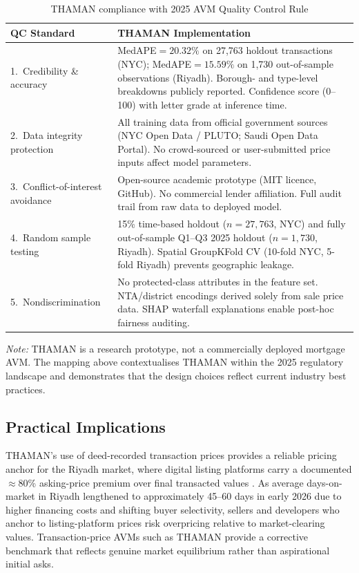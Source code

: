 \documentclass[11pt, a4paper, twoside]{article}
\begin{document}
\begin{table}[H]
  \centering
  \caption{THAMAN compliance with 2025 AVM Quality Control Rule}
  \label{tab:avm_qc}
  \begin{tabular}{p{3.5cm}p{9cm}}
    \toprule
    QC Standard & THAMAN Implementation \\
    \midrule
    1.\ Credibility \& accuracy &
      MedAPE$=20.32\%$ on 27,763 holdout transactions (NYC); MedAPE$=15.59\%$
      on 1,730 out-of-sample observations (Riyadh). Borough- and
      type-level breakdowns publicly reported. Confidence score (0--100)
      with letter grade at inference time. \\[4pt]
    2.\ Data integrity protection &
      All training data from official government sources (NYC Open Data /
      PLUTO; Saudi Open Data Portal). No crowd-sourced or user-submitted
      price inputs affect model parameters. \\[4pt]
    3.\ Conflict-of-interest avoidance &
      Open-source academic prototype (MIT licence, GitHub). No commercial
      lender affiliation. Full audit trail from raw data to deployed model. \\[4pt]
    4.\ Random sample testing &
      15\% time-based holdout ($n=27{,}763$, NYC) and fully out-of-sample
      Q1--Q3 2025 holdout ($n=1{,}730$, Riyadh). Spatial GroupKFold CV
      (10-fold NYC, 5-fold Riyadh) prevents geographic leakage. \\[4pt]
    5.\ Nondiscrimination &
      No protected-class attributes in the feature set. NTA/district
      encodings derived solely from sale price data. SHAP waterfall
      explanations enable post-hoc fairness auditing. \\
    \bottomrule
  \end{tabular}
\end{table}

\noindent\textit{Note:} THAMAN is a research prototype, not a commercially
deployed mortgage AVM. The mapping above contextualises THAMAN within the
2025 regulatory landscape and demonstrates that the design choices reflect
current industry best practices.

\subsection{Practical Implications}
\label{sec:implications}
THAMAN's use of deed-recorded transaction prices provides a reliable pricing
anchor for the Riyadh market, where digital listing platforms carry a documented
$\approx$80\% asking-price premium over final transacted values
\cite{alotaibi2021,cbre2024}. As average days-on-market in Riyadh lengthened
to approximately 45--60 days in early 2026 due to higher financing costs and
shifting buyer selectivity, sellers and developers who anchor to
listing-platform prices risk overpricing relative to market-clearing values.
Transaction-price AVMs such as THAMAN provide a corrective benchmark that
reflects genuine market equilibrium rather than aspirational initial asks.
\end{document}
